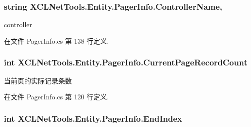 \subsubsection[{\texorpdfstring{Controller\+Name}{ControllerName}}]{\setlength{\rightskip}{0pt plus 5cm}string X\+C\+L\+Net\+Tools.\+Entity.\+Pager\+Info.\+Controller\+Name\hspace{0.3cm}{\ttfamily [get]}, {\ttfamily [set]}}\hypertarget{class_x_c_l_net_tools_1_1_entity_1_1_pager_info_a7684b1dd21faadcf80c1e2d081660569}{}\label{class_x_c_l_net_tools_1_1_entity_1_1_pager_info_a7684b1dd21faadcf80c1e2d081660569}


controller 



在文件 Pager\+Info.\+cs 第 138 行定义.

\subsubsection[{\texorpdfstring{Current\+Page\+Record\+Count}{CurrentPageRecordCount}}]{\setlength{\rightskip}{0pt plus 5cm}int X\+C\+L\+Net\+Tools.\+Entity.\+Pager\+Info.\+Current\+Page\+Record\+Count\hspace{0.3cm}{\ttfamily [get]}}\hypertarget{class_x_c_l_net_tools_1_1_entity_1_1_pager_info_ac873f1babc543a806b6ec686bf9fc86a}{}\label{class_x_c_l_net_tools_1_1_entity_1_1_pager_info_ac873f1babc543a806b6ec686bf9fc86a}


当前页的实际记录条数 



在文件 Pager\+Info.\+cs 第 120 行定义.

\subsubsection[{\texorpdfstring{End\+Index}{EndIndex}}]{\setlength{\rightskip}{0pt plus 5cm}int X\+C\+L\+Net\+Tools.\+Entity.\+Pager\+Info.\+End\+Index\hspace{0.3cm}{\ttfamily [get]}}\hypertarget{class_x_c_l_net_tools_1_1_entity_1_1_pager_info_a9d9af42d4a2c5da6386e089dbb1d33ea}{}\label{class_x_c_l_net_tools_1_1_entity_1_1_pager_info_a9d9af42d4a2c5da6386e089dbb1d33ea}


